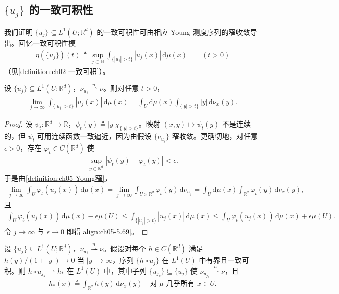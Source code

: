 \documentclass[../../main.tex]{subfiles}%
\begin{document}
\subsection{$\{u_j\}$ 的一致可积性}

我们证明 $\{u_j\}\subseteq L^1(U;\mathbb{R}^d)$ 的一致可积性可由相应 Young 测度序列的窄收敛导出。回忆一致可积性模
\begin{align}
\eta(\{u_j\})(t)\triangleq \sup_{j\in\mathbb{N}}\int_{\{|u_j|>t\}}|u_j(x)|\,\mathrm{d}\mu(x)
\qquad(t>0)\label{align:ch05-5.68}
\end{align}
（见\cref{definition:ch02-一致可积}）。

\begin{lemma}\label{lemma:ch05-一致可积}
设 $\{u_j\}\subseteq L^1(U;\mathbb{R}^d)$，$\nu_{u_j}\stackrel{n}{\rightharpoonup}\nu$。则对任意 $t>0$，
\begin{align}
\lim_{j\to\infty}\int_{\{|u_j|>t\}}|u_j(x)|\,\mathrm{d}\mu(x)
=\int_U\mathrm{d}\mu(x)\int_{\{|y|>t\}}|y|\,\mathrm{d}\nu_x(y).\label{align:ch05-5.69}
\end{align}
\end{lemma}

\begin{proof}
设 $\psi_t:\mathbb{R}^d\to\mathbb{R}$，$\psi_t(y)\triangleq |y|\chi_{\{|y|>t\}}$。映射 $(x,y)\mapsto\psi_t(y)$ 不是连续的，但 $\psi_t$ 可用连续函数一致逼近，因为由假设 $\{\nu_{u_j}\}$ 窄收敛。更确切地，对任意 $\epsilon>0$，存在 $\varphi_t\in C(\mathbb{R}^d)$ 使
\begin{align*}
\sup_{y\in\mathbb{R}^d}|\psi_t(y)-\varphi_t(y)|<\epsilon.
\end{align*}
于是由\cref{definition:ch05-Young窄}，
\begin{align*}
\lim_{j\to\infty}\int_U\varphi_t(u_j(x))\,\mathrm{d}\mu(x)
=\lim_{j\to\infty}\int_{U\times\mathbb{R}^d}\varphi_t(y)\,\mathrm{d}\nu_{u_j}
=\int_U\mathrm{d}\mu(x)\int_{\mathbb{R}^d}\varphi_t(y)\,\mathrm{d}\nu_x(y),
\end{align*}
且
\begin{align*}
\int_U\varphi_t(u_j(x))\,\mathrm{d}\mu(x)
-\epsilon\mu(U)
\leqslant\int_{\{|u_j|>t\}}|u_j(x)|\,\mathrm{d}\mu(x)
\leqslant\int_U\varphi_t(u_j(x))\,\mathrm{d}\mu(x)
+\epsilon\mu(U).
\end{align*}
令 $j\to\infty$ 与 $\epsilon\to0$ 即得\eqref{align:ch05-5.69}。
\end{proof}

\begin{proposition}\label{proposition:ch05-biting}\label{proposition:ch05-5.4.10}
设 $\{u_j\}\subseteq L^1(U;\mathbb{R}^d)$，$\nu_{u_j}\stackrel{n}{\rightharpoonup}\nu$。假设对每个 $h\in C(\mathbb{R}^d)$ 满足 $h(y)/(1+|y|)\to0$ 当 $|y|\to\infty$，序列 $\{h\circ u_j\}$ 在 $L^1(U)$ 中有界且一致可积。则 $h\circ u_{j_k}\rightharpoonup h_*$ 在 $L^1(U)$ 中，其中子列 $\{u_{j_k}\}\subseteq\{u_j\}$ 使 $\nu_{u_{j_k}}\stackrel{n}{\rightharpoonup}\nu$，且
\begin{align}
h_*(x)\triangleq \int_{\mathbb{R}^d}h(y)\,\mathrm{d}\nu_x(y)
\quad\text{对 }\mu\text{-几乎所有 }x\in U.\label{align:ch05-5.70}
\end{align}
\end{proposition}
\end{document}
